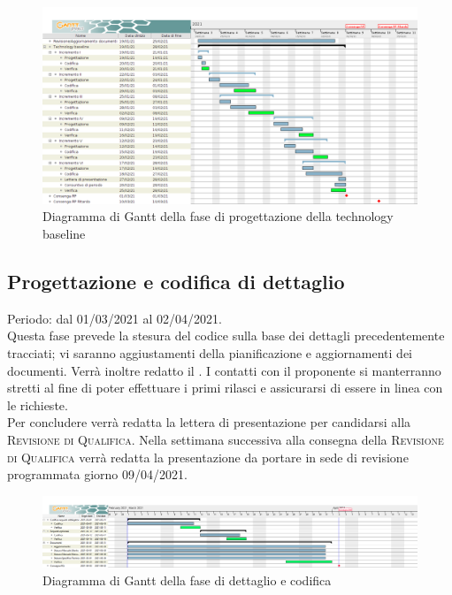 \documentclass[../piano_di_progetto.tex]{subfiles}
\begin{document}
\begin{figure}[H]
    \centering
    \includegraphics[width=18cm]{src/img/gantt/4_3_tech_baseline.png}
    \caption{Diagramma di Gantt della fase di progettazione della technology baseline}
\end{figure}

\subsection{Progettazione e codifica di dettaglio}%
\label{sub:prog_dett}
Periodo: dal 01/03/2021 al 02/04/2021.\\
Questa fase prevede la stesura del codice sulla base dei dettagli precedentemente tracciati; vi saranno aggiustamenti della pianificazione e aggiornamenti dei documenti. Verrà inoltre redatto il \textsc{}. I contatti con il proponente si manterranno stretti al fine di poter effettuare i primi rilasci e assicurarsi di essere in linea con le richieste.\\
Per concludere verrà redatta la lettera di presentazione per candidarsi alla \textsc{Revisione di Qualifica}. Nella settimana successiva alla consegna della \textsc{Revisione di Qualifica} verrà redatta la presentazione da portare in sede di revisione programmata giorno 09/04/2021. 

\begin{figure}[H]
\centering
\includegraphics[width=18cm]{src/img/gantt/03_RQ.png}
\caption{Diagramma di Gantt della fase di dettaglio e codifica}
\end{figure}
\end{document}
